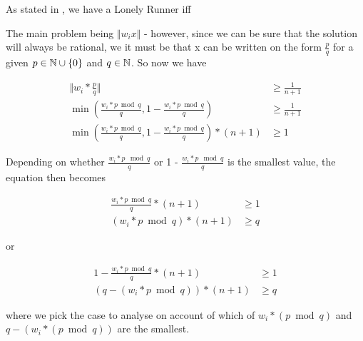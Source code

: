 As stated in , we have a Lonely Runner iff

The main problem being $\Vert w_i x\Vert$ - however, since we can be sure that the solution will always be rational, we it must be that x can be written on the form $\frac{p}{q}$ for a given $p \in \mathbb{N}\cup\{0\}$ and $q \in \mathbb{N}$. So now we have

\begin{equation}
\label{compareRewriteOne}
\begin{split}
\Vert w_i * \frac{p}{q}\Vert &\geq \frac{1}{n+1}\\
\min(\frac{w_i * p \bmod q}{q}, 1 - \frac{w_i * p \bmod q}{q}) &\geq \frac{1}{n+1}\\
\min(\frac{w_i * p \bmod q}{q}, 1 - \frac{w_i * p \bmod q}{q}) * (n+1) &\geq 1
\end{split}
\end{equation}

Depending on whether $\frac{w_i * p \mod q}{q}$ or 1 - $\frac{w_i * p \mod q}{q}$ is the smallest value, the equation then becomes

\begin{equation}
\label{compareRewriteTwo}
\begin{split}
\frac{w_i * p \bmod q}{q} * (n+1) &\geq 1\\
(w_i * p \bmod q) * (n+1) &\geq q 
\end{split}
\end{equation}

or 

\begin{equation}
\label{compareRewriteThree}
\begin{split}
1 - \frac{w_i * p \bmod q}{q} * (n+1) &\geq 1\\
(q - (w_i * p \bmod q)) * (n+1) &\geq q
\end{split}
\end{equation}

where we pick the case to analyse on account of which of $w_i * (p \bmod q)$ and $q - (w_i * (p \bmod q))$ are the smallest.

